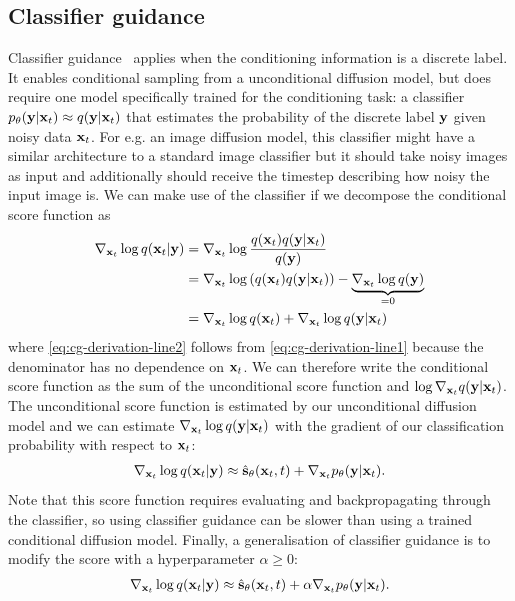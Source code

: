 \subsection{Classifier guidance}
Classifier guidance~\citep{song2020score} applies when the conditioning information is a discrete label. It enables conditional sampling from a unconditional diffusion model, but does require one model specifically trained for the conditioning task: a classifier $p_\theta({\mathbf{y}}|{\mathbf{x}}_t) \approx q({\mathbf{y}}|{\mathbf{x}}_t)$ that estimates the probability of the discrete label ${\mathbf{y}}$ given noisy data ${\mathbf{x}}_t$. For e.g. an image diffusion model, this classifier might have a similar architecture to a standard image classifier but it should take noisy images as input and additionally should receive the timestep describing how noisy the input image is. We can make use of the classifier if we decompose the conditional score function as
\begin{align}
    \nabla_{{\mathbf{x}}_t} \log q({\mathbf{x}}_t|{\mathbf{y}}) &= \nabla_{{\mathbf{x}}_t} \log \frac{q({\mathbf{x}}_t)q({\mathbf{y}}|{\mathbf{x}}_t)}{q({\mathbf{y}})} \label{eq:cg-derivation-line1} \\
    &= \nabla_{{\mathbf{x}}_t} \log \left( q({\mathbf{x}}_t) q({\mathbf{y}}|{\mathbf{x}}_t) \right) - \underbrace{\nabla_{{\mathbf{x}}_t} \log q({\mathbf{y}})}_{=0}  \label{eq:cg-derivation-line2} \\
    &= \nabla_{{\mathbf{x}}_t} \log q({\mathbf{x}}_t) + \nabla_{{\mathbf{x}}_t} \log q({\mathbf{y}}|{\mathbf{x}}_t)  \label{eq:cg-derivation-line3}
\end{align}
where \cref{eq:cg-derivation-line2} follows from \cref{eq:cg-derivation-line1} because the denominator has no dependence on ${\mathbf{x}}_t$. We can therefore write the conditional score function as the sum of the unconditional score function and $\log \nabla_{{\mathbf{x}}_t} q({\mathbf{y}}|{\mathbf{x}}_t)$. The unconditional score function is estimated by our unconditional diffusion model and we can estimate $\nabla_{{\mathbf{x}}_t} \log q({\mathbf{y}}|{\mathbf{x}}_t)$ with the gradient of our classification probability with respect to ${\mathbf{x}}_t$:
\begin{align}
    \nabla_{{\mathbf{x}}_t} \log q({\mathbf{x}}_t|{\mathbf{y}}) \approx \hat{{\mathbf{s}}}_\theta({\mathbf{x}}_t, t) + \nabla_{{\mathbf{x}}_t} p_\theta({\mathbf{y}}|{\mathbf{x}}_t).
\end{align}
Note that this score function requires evaluating and backpropagating through the classifier, so using classifier guidance can be slower than using a trained conditional diffusion model. Finally, a generalisation of classifier guidance is to modify the score with a hyperparameter $\alpha \geq 0$:
\begin{align}
    \nabla_{{\mathbf{x}}_t} \log q({\mathbf{x}}_t|{\mathbf{y}}) \approx \hat{{\mathbf{s}}}_\theta({\mathbf{x}}_t, t) + \alpha \nabla_{{\mathbf{x}}_t} p_\theta({\mathbf{y}}|{\mathbf{x}}_t). \label{eq:cg-score-function}
\end{align}
